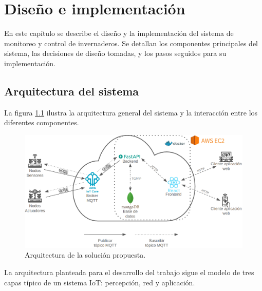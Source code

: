 
\chapter{Diseño e implementación} %

\label{Chapter3} %

En este capítulo se describe el diseño y la implementación del sistema de
monitoreo y control de invernaderos. Se detallan los componentes principales
del sistema, las decisiones de diseño tomadas, y los pasos seguidos para su
implementación.

\section{Arquitectura del sistema}

La figura \ref{fig:arquitectura} ilustra la arquitectura general del sistema y
la interacción entre los diferentes componentes.

\begin{figure}[H]
    \centering
    \includegraphics[width=.99\textwidth]{./Images/14.png}
    \caption{Arquitectura de la solución propuesta.}
    \label{fig:arquitectura}
\end{figure}

La arquitectura planteada para el desarrollo del trabajo sigue el modelo de
tres capas típico de un sistema IoT: percepción, red y aplicación.

